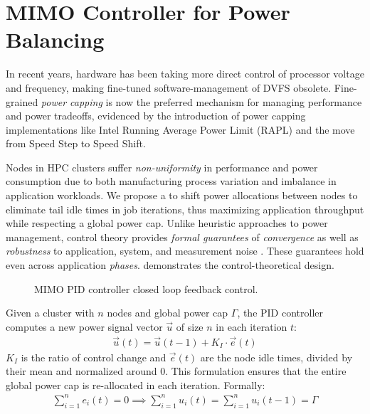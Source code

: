 \section{MIMO Controller for Power Balancing}

In recent years, hardware has been taking more direct control of processor voltage and frequency, making fine-tuned software-management of DVFS obsolete.
Fine-grained \emph{power capping} is now the preferred mechanism for managing performance and power tradeoffs, evidenced by the introduction of power capping implementations like Intel Running Average Power Limit (RAPL) \cite{RAPL} and the move from Speed Step to Speed Shift.

Nodes in HPC clusters suffer \emph{non-uniformity} in performance and power consumption due to both manufacturing process variation and imbalance in application workloads.
We propose a  to shift power allocations between nodes to eliminate tail idle times in job iterations, thus maximizing application throughput while respecting a global power cap.
Unlike heuristic approaches to power management, control theory provides \emph{formal guarantees} of \emph{convergence} as well as \emph{robustness} to application, system, and measurement noise \cite{Hellerstein2004a}.
These guarantees hold even across application \emph{phases}.
 demonstrates the control-theoretical design.

\begin{figure}[t]
  
  \caption{MIMO PID controller closed loop feedback control.}
  \label{fig:runtime-nlpb}
\end{figure}

Given a cluster with $n$ nodes and global power cap $\Gamma$, the PID controller computes a new power signal vector $\vec{u}$ of size $n$ in each iteration $t$:
\begin{eqnarray}
\vec{u}(t) = \vec{u}(t-1) + K_I \cdot \vec{e}(t)
\end{eqnarray}
$K_I$ is the ratio of control change and $\vec{e}(t)$ are the node idle times, divided by their mean and normalized around $0$.
This formulation ensures that the entire global power cap is re-allocated in each iteration.
Formally:
\begin{eqnarray}
\sum_{i=1}^{n} e_i(t) = 0 \implies \sum_{i=1}^{n} u_i(t) = \sum_{i=1}^{n} u_i(t-1) = \Gamma
\end{eqnarray}

